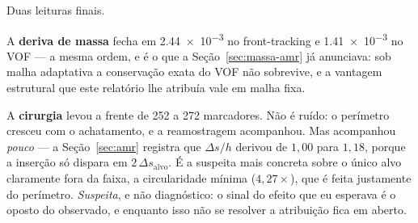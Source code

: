Duas leituras finais.

A \textbf{deriva de massa} fecha em \num{2.44e-3} no front-tracking e
\num{1.41e-3} no VOF --- a mesma ordem, e \'e o que a Se\c{c}\~ao~\ref{sec:massa-amr}
j\'a anunciava: sob malha adaptativa a conserva\c{c}\~ao exata do VOF n\~ao
sobrevive, e a vantagem estrutural que este relat\'orio lhe atribu\'ia vale em
malha fixa.

A \textbf{cirurgia} levou a frente de 252 a 272 marcadores. N\~ao \'e ru\'ido: o
per\'imetro cresceu com o achatamento, e a reamostragem acompanhou. Mas
acompanhou \emph{pouco} --- a Se\c{c}\~ao~\ref{sec:amr} registra que
$\Delta s / h$ derivou de $1{,}00$ para $1{,}18$, porque a inser\c{c}\~ao s\'o
dispara em $2\,\Delta s_{\text{alvo}}$. \'E a suspeita mais concreta sobre o
\'unico alvo claramente fora da faixa, a circularidade m\'inima
($4{,}27\times$), que \'e feita justamente do per\'imetro. \emph{Suspeita}, e
n\~ao diagn\'ostico: o sinal do efeito que eu esperava \'e o oposto do observado,
e enquanto isso n\~ao se resolver a atribui\c{c}\~ao fica em aberto.

